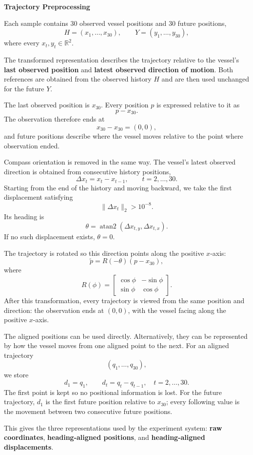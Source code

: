 \documentclass[11pt]{article}
\begin{document}
{\Large\bfseries Trajectory Preprocessing}\par

Each sample contains 30 observed vessel positions and 30 future positions,
\[
H=(x_1,\ldots,x_{30}), \qquad
Y=(y_1,\ldots,y_{30}),
\]
where every \(x_t,y_t\in\mathbb{R}^2\).

The transformed representation describes the trajectory relative to the vessel's \textbf{last observed position} and \textbf{latest observed direction of motion}. Both references are obtained from the observed history \(H\) and are then used unchanged for the future \(Y\).

The last observed position is \(x_{30}\). Every position \(p\) is expressed relative to it as
\[
p-x_{30}.
\]
The observation therefore ends at
\[
x_{30}-x_{30}=(0,0),
\]
and future positions describe where the vessel moves relative to the point where observation ended.

Compass orientation is removed in the same way. The vessel's latest observed direction is obtained from consecutive history positions,
\[
\Delta x_t=x_t-x_{t-1},
\qquad t=2,\ldots,30.
\]
Starting from the end of the history and moving backward, we take the first displacement satisfying
\[
\|\Delta x_t\|_2>10^{-8}.
\]
Its heading is
\[
\theta=
\operatorname{atan2}
(\Delta x_{t,y},\Delta x_{t,x}).
\]
If no such displacement exists, \(\theta=0\).

The trajectory is rotated so this direction points along the positive \(x\)-axis:
\[
\tilde p=R(-\theta)(p-x_{30}),
\]
where
\[
R(\phi)=
\begin{bmatrix}
\cos\phi & -\sin\phi\\
\sin\phi & \cos\phi
\end{bmatrix}.
\]
After this transformation, every trajectory is viewed from the same position and direction: the observation ends at \((0,0)\), with the vessel facing along the positive \(x\)-axis.

The aligned positions can be used directly. Alternatively, they can be represented by how the vessel moves from one aligned point to the next. For an aligned trajectory
\[
(q_1,\ldots,q_{30}),
\]
we store
\[
d_1=q_1,
\qquad
d_t=q_t-q_{t-1},
\quad t=2,\ldots,30.
\]
The first point is kept so no positional information is lost. For the future trajectory, \(d_1\) is the first future position relative to \(x_{30}\); every following value is the movement between two consecutive future positions.

This gives the three representations used by the experiment system: \textbf{raw coordinates}, \textbf{heading-aligned positions}, and \textbf{heading-aligned displacements}.
\end{document}
